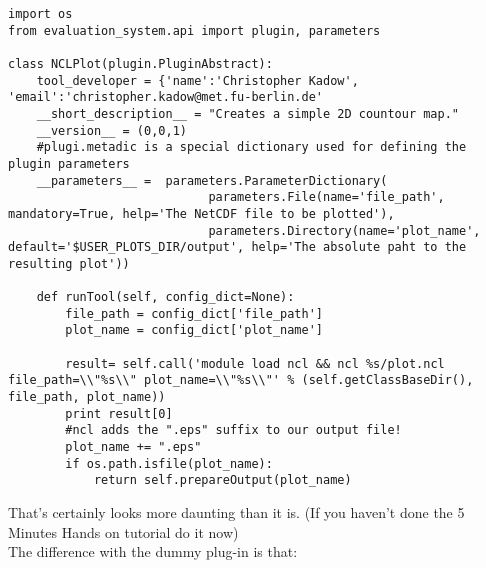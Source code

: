 \documentclass[a4paper,11pt]{ltxdoc}
\begin{document}
\begin{lstlisting}
import os
from evaluation_system.api import plugin, parameters

class NCLPlot(plugin.PluginAbstract):
    tool_developer = {'name':'Christopher Kadow', 'email':'christopher.kadow@met.fu-berlin.de'
    __short_description__ = "Creates a simple 2D countour map." 
    __version__ = (0,0,1)
    #plugi.metadic is a special dictionary used for defining the plugin parameters
    __parameters__ =  parameters.ParameterDictionary(
                            parameters.File(name='file_path', mandatory=True, help='The NetCDF file to be plotted'),
                            parameters.Directory(name='plot_name', default='$USER_PLOTS_DIR/output', help='The absolute paht to the resulting plot'))

    def runTool(self, config_dict=None):
        file_path = config_dict['file_path']
        plot_name = config_dict['plot_name']

        result= self.call('module load ncl && ncl %s/plot.ncl file_path=\\"%s\\" plot_name=\\"%s\\"' % (self.getClassBaseDir(), file_path, plot_name))
        print result[0]
        #ncl adds the ".eps" suffix to our output file!
        plot_name += ".eps" 
        if os.path.isfile(plot_name):
            return self.prepareOutput(plot_name)
\end{lstlisting}
That's certainly looks more daunting than it is. (If you haven't done the 5 Minutes Hands on tutorial do it now)\\
The difference with the dummy plug-in is that:
\end{document}
